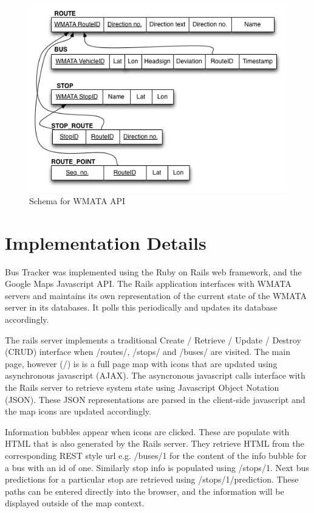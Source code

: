 \documentclass[12pt]{report}
\begin{document}
\begin{figure}[ht]
  \centerline{\includegraphics[scale=0.6]{bus-schema.png}}
  \caption{Schema for WMATA API}
  \label{fig:busSchema}
\end{figure}


\chapter{Implementation Details}

Bus Tracker was implemented using the Ruby on Rails web framework, and the Google Maps Javascript API.  The Rails application interfaces with WMATA servers and maintains its own representation of the current state of the WMATA server in its databases.  It polls this periodically and updates its database accordingly.  

The rails server implements a traditional Create / Retrieve / Update / Destroy (CRUD) interface when /routes/, /stops/ and /buses/ are visited.  The main page, however (/) is is a full page map with icons that are updated using asynchronous javascript (AJAX).  The asyncronous javascript calls interface with the Rails server to retrieve system state using Javascript Object Notation (JSON).  These JSON representations are parsed in the client-side javascript and the map icons are updated accordingly.

Information bubbles appear when icons are clicked.  These are populate with HTML that is also generated by the Rails server.  They retrieve HTML from the corresponding REST style url e.g. /buses/1 for the content of the info bubble for a bus with an id of one.  Similarly stop info is populated using /stops/1.  Next bus predictions for a particular stop are retrieved using /stops/1/prediction.  These paths can be entered directly into the browser, and the information will be displayed outside of the map context.
\end{document}
